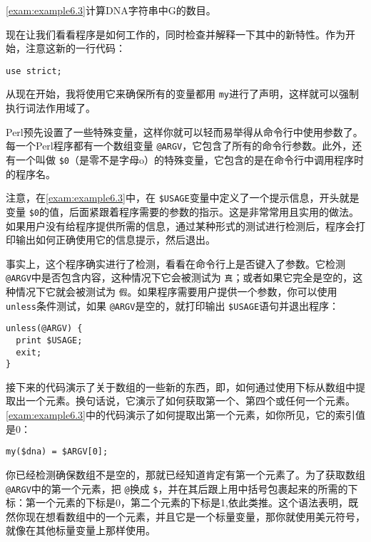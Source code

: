 \autoref{exam:example6.3}计算DNA字符串中G的数目。



现在让我们看看程序是如何工作的，同时检查并解释一下其中的新特性。作为开始，注意这新的一行代码：

\begin{lstlisting}
use strict;
\end{lstlisting}

从现在开始，我将使用它来确保所有的变量都用 \verb|my|进行了声明，这样就可以强制执行词法作用域了。

Perl预先设置了一些特殊变量，这样你就可以轻而易举得从命令行中使用参数了。每一个Perl程序都有一个数组变量 \verb|@ARGV|，它包含了所有的命令行参数。此外，还有一个叫做 \verb|$0|（是零不是字母o）的特殊变量，它包含的是在命令行中调用程序时的程序名。

注意，在\autoref{exam:example6.3}中，在 \verb|$USAGE|变量中定义了一个提示信息，开头就是变量 \verb|$0|的值，后面紧跟着程序需要的参数的指示。这是非常常用且实用的做法。如果用户没有给程序提供所需的信息，通过某种形式的测试进行检测后，程序会打印输出如何正确使用它的信息提示，然后退出。

事实上，这个程序确实进行了检测，看看在命令行上是否键入了参数。它检测 \verb|@ARGV|中是否包含内容，这种情况下它会被测试为 \verb|真|；或者如果它完全是空的，这种情况下它就会被测试为 \verb|假|。如果程序需要用户提供一个参数，你可以使用 \verb|unless|条件测试，如果 \verb|@ARGV|是空的，就打印输出 \verb|$USAGE|语句并退出程序：

\begin{lstlisting}
unless(@ARGV) {
  print $USAGE;
  exit;
}
\end{lstlisting}

接下来的代码演示了关于数组的一些新的东西，即，如何通过使用下标从数组中提取出一个元素。换句话说，它演示了如何获取第一个、第四个或任何一个元素。\autoref{exam:example6.3}中的代码演示了如何提取出第一个元素，如你所见，它的索引值是0：

\begin{lstlisting}
my($dna) = $ARGV[0];
\end{lstlisting}

你已经检测确保数组不是空的，那就已经知道肯定有第一个元素了。为了获取数组 \verb|@ARGV|中的第一个元素，把 \verb|@|换成 \verb|$|，并在其后跟上用中括号包裹起来的所需的下标：第一个元素的下标是0，第二个元素的下标是1,依此类推。这个语法表明，既然你现在想看数组中的一个元素，并且它是一个标量变量，那你就使用美元符号，就像在其他标量变量上那样使用。

